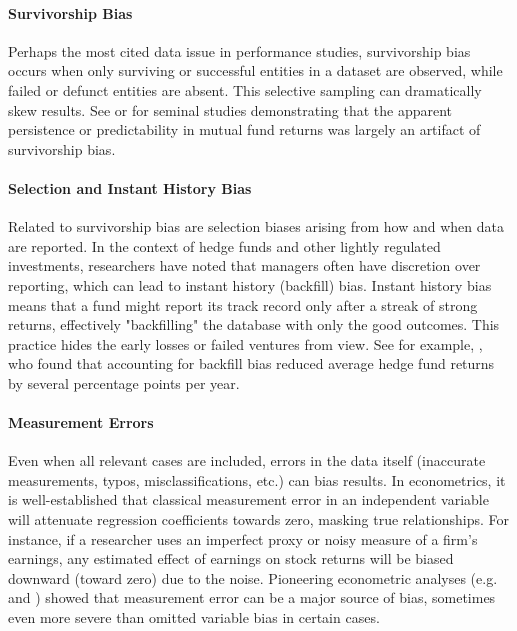 \documentclass{article}
\begin{document}
\begin{appendices}
\paragraph{Survivorship Bias}
Perhaps the most cited data issue in performance studies, survivorship bias occurs when only surviving or successful entities in a dataset are observed, while failed or defunct entities are absent. This selective sampling can dramatically skew results.
See \cite{Brown1992} or \cite{Brown1995} for seminal studies demonstrating that the apparent persistence or predictability in mutual fund returns was largely an artifact of survivorship bias.

\paragraph{Selection and Instant History Bias}
Related to survivorship bias are selection biases arising from how and when data are reported. In the context of hedge funds and other lightly regulated investments, researchers have noted that managers often have discretion over reporting, which can lead to instant history (backfill) bias. Instant history bias means that a fund might report its track record only after a streak of strong returns, effectively "backfilling" the database with only the good outcomes. This practice hides the early losses or failed ventures from view. See for example, \cite{Fung2000}, who found that accounting for backfill bias reduced average hedge fund returns by several percentage points per year.

\paragraph{Measurement Errors}
Even when all relevant cases are included, errors in the data itself (inaccurate measurements, typos, misclassifications, etc.) can bias results. In econometrics, it is well-established that classical measurement error in an independent variable will attenuate regression coefficients towards zero, masking true relationships. For instance, if a researcher uses an imperfect proxy or noisy measure of a firm's earnings, any estimated effect of earnings on stock returns will be biased downward (toward zero) due to the noise. Pioneering econometric analyses (e.g. \cite{Griliches1986} and \cite{Bound2001}) showed that measurement error can be a major source of bias, sometimes even more severe than omitted variable bias in certain cases.


\end{appendices}
\end{document}
